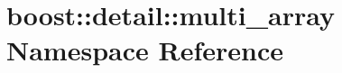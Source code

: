 \hypertarget{namespaceboost_1_1detail_1_1multi__array}{}\section{boost\+:\+:detail\+:\+:multi\+\_\+array Namespace Reference}
\label{namespaceboost_1_1detail_1_1multi__array}
